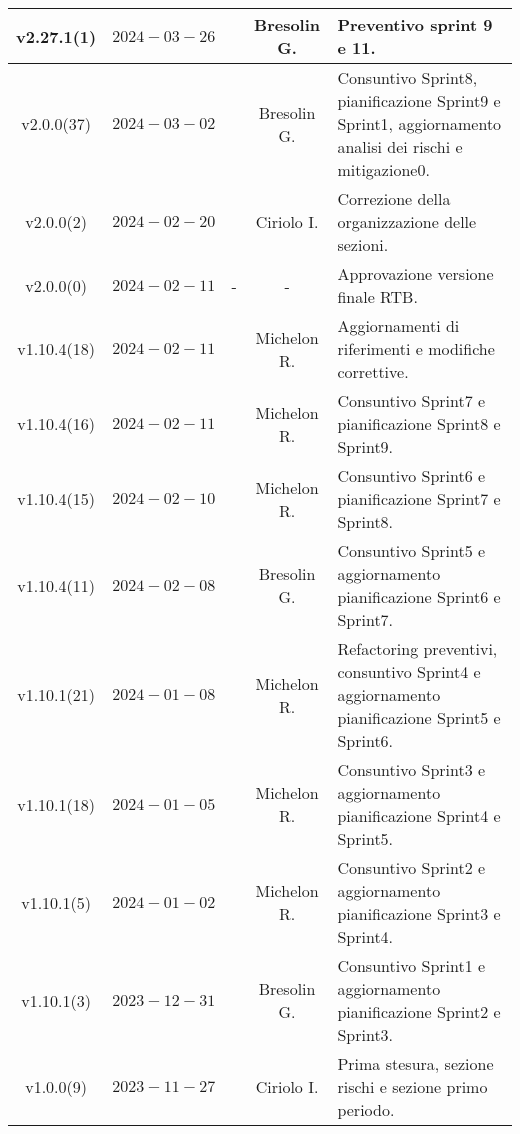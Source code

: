 {\begin{xltabular}{\textwidth}{c|c|c|c|X}
\endlastfoot
\hline
v2.27.1(1) & $2024-03-26$ &  & Bresolin G. & Preventivo sprint 9 e 11.\\
\hline
v2.0.0(37) & $2024-03-02$ &  & Bresolin G. & Consuntivo Sprint8, pianificazione Sprint9 e Sprint1, aggiornamento analisi dei rischi e mitigazione0.\\
\hline
v2.0.0(2) & $2024-02-20$ &  & Ciriolo I. & Correzione della organizzazione delle sezioni.\\
\hline
v2.0.0(0) & $2024-02-11$ & - & - & Approvazione versione finale RTB.\\
\hline
v1.10.4(18) & $2024-02-11$ &  & Michelon R. & Aggiornamenti di riferimenti e modifiche correttive.\\
\hline
v1.10.4(16) & $2024-02-11$ &  & Michelon R. & Consuntivo Sprint7 e pianificazione Sprint8 e Sprint9.\\
\hline
v1.10.4(15) & $2024-02-10$ &  & Michelon R. & Consuntivo Sprint6 e pianificazione Sprint7 e Sprint8.\\
\hline
v1.10.4(11) & $2024-02-08$ &  & Bresolin G. & Consuntivo Sprint5 e aggiornamento pianificazione Sprint6 e Sprint7.\\
\hline
v1.10.1(21) & $2024-01-08$ &  & Michelon R. & Refactoring preventivi, consuntivo Sprint4 e aggiornamento pianificazione Sprint5 e Sprint6.\\
\hline
v1.10.1(18) & $2024-01-05$ &  & Michelon R. & Consuntivo Sprint3 e aggiornamento pianificazione Sprint4 e Sprint5.\\
\hline
v1.10.1(5) & $2024-01-02$ &  & Michelon R. & Consuntivo Sprint2 e aggiornamento pianificazione Sprint3 e Sprint4.\\
\hline
v1.10.1(3) & $2023-12-31$ &  & Bresolin G. & Consuntivo Sprint1 e aggiornamento pianificazione Sprint2 e Sprint3.\\
\hline
v1.0.0(9) & $2023-11-27$ &  & Ciriolo I. & Prima stesura, sezione rischi e sezione primo periodo.
    
\end{xltabular}}